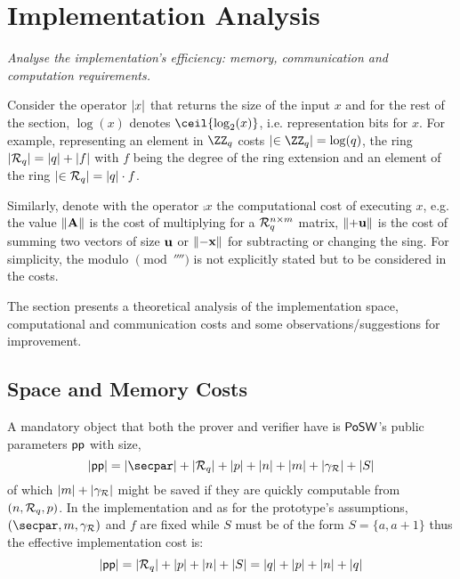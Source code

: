 
\section{Implementation Analysis}\label{sec:analysis}

\begin{center}
	\itshape
	Analyse the implementation's efficiency: memory, communication and computation requirements.
\end{center}

Consider the operator $\left\lvert x \right\rvert$ that returns the size of the input $x$ and
for the rest of the section, $\log(x)$ denotes $\ceil{\log_2(x)}$, i.e. representation bits for $x$.
For example, representing an element in $\ZZ_q$ costs $\card{\in\ZZ_q} = \log(q)$, the
ring $\card{\Rring[q]} = \card{q} + \card{f}$ with $f$ being the degree of the ring extension
and an element of the ring $\card{ \in \Rring[q]} = \card{q} \cdot f$.

Similarly, denote with the operator $\comp{x}$ the computational cost of executing $x$, e.g.
the value $\comp{\vA}$ is the cost of multiplying for a $\Rring[q]^{n \times m}$ matrix, $\comp{+\vu}$
is the cost of summing two vectors of size $\vu$ or $\comp{-\vx}$ for subtracting or changing the sing.
For simplicity, the modulo $\pmod{\qprime}$ is not explicitly stated but to be considered in the costs.

The section presents a theoretical analysis of the implementation space, computational
and communication costs and some observations/suggestions for improvement.

\vspace{3mm}

\subsection{Space and Memory Costs}\label{sec:analysis:space}

A mandatory object that both the prover and verifier have is $\textsf{PoSW}$'s public parameters $\pp$ with size,
\[ \card{\pp} = \card{\secpar} + \card{\Rring[\qprime]} + \card{\pprime} + \card{n}
	+ \card{m} + \card{\gamma_{\Rring}} + \card{S} \]
%
of which $\card{m} + \card{\gamma_{\Rring}}$ might be saved if they are quickly computable from
$(n,\Rring[\qprime],\pprime)$.
%
In the implementation and as for the prototype's assumptions, $(\secpar,m,\gamma_{\Rring})$ and
$f$ are fixed while $S$ must be of the form $S=\{a,a+1\}$ thus the effective implementation cost is:
\[ \card{\pp} = \card{\Rring[\qprime]} + \card{\pprime} + \card{n} + \card{S} =
	\card{\qprime} + \card{\pprime} + \card{n} + \card{\qprime} \]


